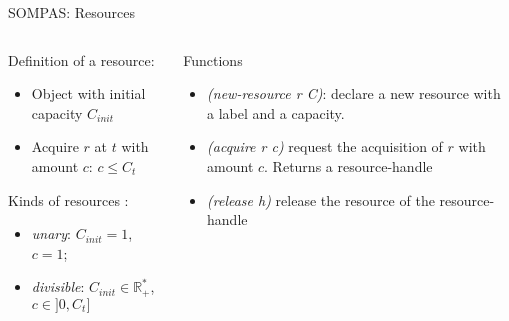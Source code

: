 \begin{frame}[t]{SOMPAS: Resources}
    \begin{columns}
        \begin{column}{0.5\textwidth}
            Definition of a resource:
            \begin{itemize}
                \item Object with initial capacity $C_{init}$
                \item Acquire $r$ at $t$ with amount $c$: $c \leq C_t$ 
            \end{itemize}
            Kinds of resources : 
            \begin{itemize}
                \item \emph{unary}: $C_{init} = 1$, $c = 1$;
                \item \emph{divisible}: $C_{init} \in  \mathbb{R}_+^*$, $c \in ]0, C_t]$
            \end{itemize}
        \end{column}
        \begin{column}{0.5\textwidth}
            Functions
            \begin{itemize}
                \item \textit{(new-resource r C)}: declare a new resource with a label and a capacity.
                \item \emph{(acquire r c)} request the acquisition of $r$ with amount $c$. Returns a resource-handle
                \item \emph{(release h)} release the resource of the resource-handle
            \end{itemize}
        \end{column}
    \end{columns}
\end{frame}


